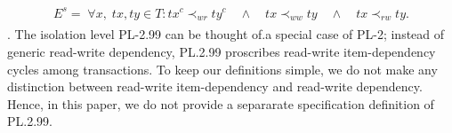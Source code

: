 \documentclass[acmlarge, ,11pt]{acmart}
\begin{document}
\begin{align}
\begin{split}
E^{s} =  \; \forall x, \; \mathit{tx}, \mathit{ty} %
 \in T: 
\mathit{tx}^{c} \prec_{\mathit{wr}} \mathit{ty}^{c} %
 \quad \wedge \quad 
\mathit{tx} \prec_{\mathit{ww}} \mathit{ty} %
 \quad \wedge \quad 
 \mathit{tx} \prec_{\mathit{rw}} \mathit{ty}. %
\end{split}
  \end{align}.
  The isolation level  PL-2.99 can be thought of.a special case of PL-2; instead of generic  read-write dependency, PL.2.99 proscribes read-write item-dependency cycles among transactions. To keep our definitions simple, we do not make any distinction between  read-write item-dependency and  read-write dependency. Hence, in this paper, we do not provide a separarate specification definition of  PL.2.99. %
\end{document}
